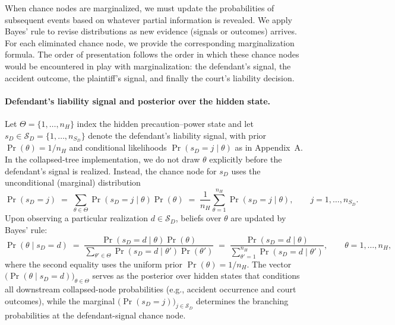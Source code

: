 \documentclass{article}
\begin{document}
When chance nodes are marginalized, we must update the probabilities of subsequent events based on whatever partial information is revealed. We apply Bayes’ rule to revise distributions as new evidence (signals or outcomes) arrives. For each eliminated chance node, we provide the corresponding marginalization formula. The order of presentation follows the order in which these chance nodes would be encountered in play with marginalization: the defendant’s signal, the accident outcome, the plaintiff’s signal, and finally the court’s liability decision.

\paragraph{Defendant’s liability signal and posterior over the hidden state.} 
Let $\Theta=\{1,\dots,n_H\}$ index the hidden precaution–power state and let $s_D\in\mathcal{S}_D=\{1,\dots,n_{S_D}\}$ denote the defendant’s liability signal, with prior $\Pr(\theta)=1/n_H$ and conditional likelihoods $\Pr(s_D=j\mid \theta)$ as in Appendix~A. In the collapsed-tree implementation, we do not draw $\theta$ explicitly before the defendant’s signal is realized. Instead, the chance node for $s_D$ uses the unconditional (marginal) distribution \[ \Pr(s_D=j) \;=\; \sum_{\theta\in\Theta}\Pr(s_D=j\mid \theta)\Pr(\theta) \;=\; \frac{1}{n_H}\sum_{\theta=1}^{n_H}\Pr(s_D=j\mid \theta), \qquad j=1,\dots,n_{S_D}. \] Upon observing a particular realization $d\in\mathcal{S}_D$, beliefs over $\theta$ are updated by Bayes’ rule: \[ \Pr(\theta\mid s_D=d) \;=\; \frac{\Pr(s_D=d\mid \theta)\Pr(\theta)}{\sum_{\theta'\in\Theta}\Pr(s_D=d\mid \theta')\Pr(\theta')} \;=\; \frac{\Pr(s_D=d\mid \theta)}{\sum_{\theta'=1}^{n_H}\Pr(s_D=d\mid \theta')}, \qquad \theta=1,\dots,n_H, \] where the second equality uses the uniform prior $\Pr(\theta)=1/n_H$. The vector $\bigl(\Pr(\theta\mid s_D=d)\bigr)_{\theta\in\Theta}$ serves as the posterior over hidden states that conditions all downstream collapsed-node probabilities (e.g., accident occurrence and court outcomes), while the marginal $\bigl(\Pr(s_D=j)\bigr)_{j\in\mathcal{S}_D}$ determines the branching probabilities at the defendant-signal chance node.
\end{document}
